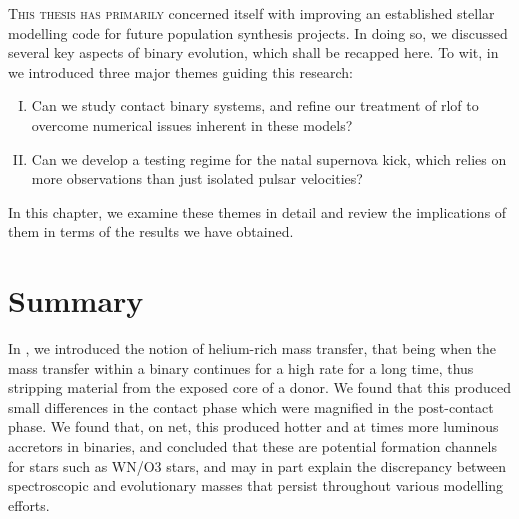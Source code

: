 \label{chap:conclusion}


\lettrine[lines=3]{T}{his thesis has primarily} concerned itself with improving an established stellar modelling code for future population synthesis projects. In doing so, we discussed several key aspects of binary evolution, which shall be recapped here. To wit, in  we introduced three major themes guiding this research:

\begin{enumerate}[I.]
	\item Can we study contact binary systems, and refine our treatment of \gls{rlof} to overcome numerical issues inherent in these models?

	\item Can we develop a testing regime for the natal supernova kick, which relies on more observations than just isolated pulsar velocities?
\end{enumerate}

In this chapter, we examine these themes in detail and review the implications of them in terms of the results we have obtained.

\section{Summary}


In , we introduced the notion of helium-rich mass transfer, that being when the mass transfer within a binary continues for a high rate for a long time, thus stripping material from the exposed core of a donor. We found that this produced small differences in the contact phase which were magnified in the post-contact phase. We found that, on net, this produced hotter and at times more luminous accretors in binaries, and concluded that these are potential formation channels for stars such as WN/O3 stars, and may in part explain the discrepancy between spectroscopic and evolutionary masses that persist throughout various modelling efforts.

